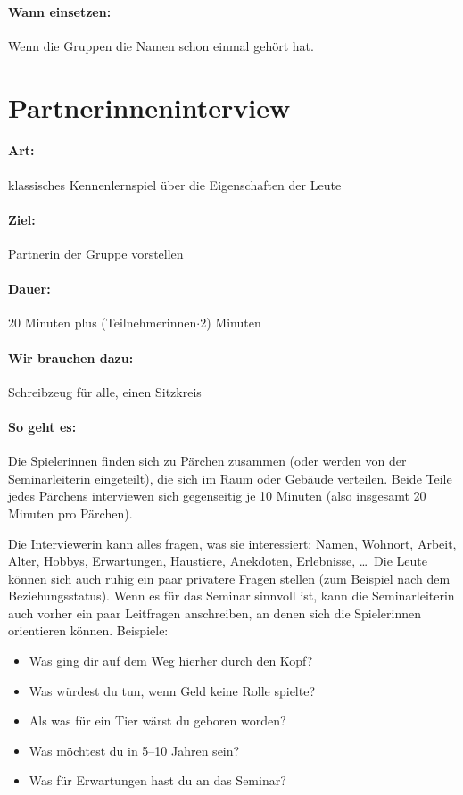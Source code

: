 \paragraph{Wann einsetzen:} Wenn die Gruppen die Namen schon einmal gehört hat.

\section{Partnerinneninterview}
\paragraph{Art:} klassisches Kennenlernspiel über die Eigenschaften der Leute
\paragraph{Ziel:} Partnerin der Gruppe vorstellen
\paragraph{Dauer:} 20 Minuten plus (Teilnehmerinnen$\cdot$2) Minuten
\paragraph{Wir brauchen dazu:} Schreibzeug für alle, einen Sitzkreis
\paragraph{So geht es:}
Die Spielerinnen finden sich zu Pärchen zusammen (oder werden von der Seminarleiterin eingeteilt), die sich im Raum oder Gebäude verteilen. Beide Teile jedes Pärchens interviewen sich gegenseitig je 10 Minuten (also insgesamt 20 Minuten pro Pärchen).

Die Interviewerin kann alles fragen, was sie interessiert: Namen, Wohnort, Arbeit, Alter, Hobbys, Erwartungen, Haustiere, Anekdoten, Erlebnisse, \ldots\ Die Leute können sich auch ruhig ein paar privatere Fragen stellen (zum Beispiel nach dem Beziehungsstatus). Wenn es für das Seminar sinnvoll ist, kann die Seminarleiterin auch vorher ein paar Leitfragen anschreiben, an denen sich die Spielerinnen orientieren können. Beispiele:
  \begin{itemize}
    \item Was ging dir auf dem Weg hierher durch den Kopf?
    \item Was würdest du tun, wenn Geld keine Rolle spielte?
    \item Als was für ein Tier wärst du geboren worden?
    \item Was möchtest du in 5--10 Jahren sein?
    \item Was für Erwartungen hast du an das Seminar?
  \end{itemize}

